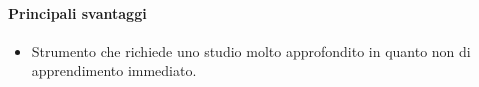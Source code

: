\documentclass[../PianoDiQualifica.tex]{subfiles}
\begin{document}
			\paragraph{Principali svantaggi}
				\begin{itemize}
					\item Strumento che richiede uno studio molto approfondito in quanto non di apprendimento immediato.
				\end{itemize}
\end{document}
